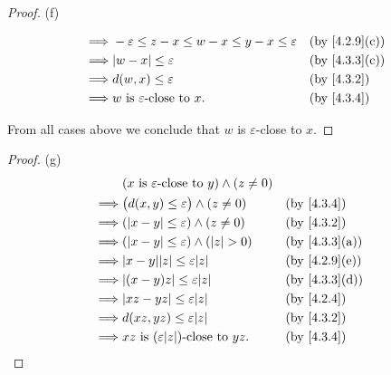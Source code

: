 \begin{proof}{(f)}
\begin{itemize}
\begin{align*}
            \implies & -\varepsilon \leq z - x \leq w - x \leq y - x \leq \varepsilon &  & \text{(by \cref{4.2.9}(c))} \\
            \implies & \abs{w - x} \leq \varepsilon                                   &  & \text{(by \cref{4.3.3}(c))} \\
            \implies & d(w, x) \leq \varepsilon                                       &  & \text{(by \cref{4.3.2})}    \\
            \implies & w \text{ is } \varepsilon\text{-close to } x.                  &  & \text{(by \cref{4.3.4})}
          \end{align*}
  \end{itemize}
  From all cases above we conclude that \(w\) is \(\varepsilon\)-close to \(x\).
\end{proof}

\begin{proof}{(g)}
  \begin{align*}
             & (x \text{ is } \varepsilon\text{-close to } y) \land (z \neq 0)                                  \\
    \implies & \big(d(x, y) \leq \varepsilon\big) \land (z \neq 0)             &  & \text{(by \cref{4.3.4})}    \\
    \implies & (\abs{x - y} \leq \varepsilon) \land (z \neq 0)                 &  & \text{(by \cref{4.3.2})}    \\
    \implies & (\abs{x - y} \leq \varepsilon) \land (\abs{z} > 0)              &  & \text{(by \cref{4.3.3}(a))} \\
    \implies & \abs{x - y} \abs{z} \leq \varepsilon \abs{z}                    &  & \text{(by \cref{4.2.9}(e))} \\
    \implies & \abs{(x - y)z} \leq \varepsilon \abs{z}                         &  & \text{(by \cref{4.3.3}(d))} \\
    \implies & \abs{xz - yz} \leq \varepsilon \abs{z}                          &  & \text{(by \cref{4.2.4})}    \\
    \implies & d(xz, yz) \leq \varepsilon \abs{z}                              &  & \text{(by \cref{4.3.2})}    \\
    \implies & xz \text{ is } (\varepsilon \abs{z})\text{-close to } yz.       &  & \text{(by \cref{4.3.4})}
  \end{align*}
\end{proof}

